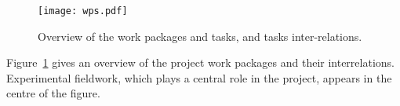 \begin{figure}[h!]
\centering
\texttt{[image: wps.pdf]}
\caption{Overview of the work packages and tasks, and tasks inter-relations.}
\label{fig:wps}
\end{figure}





Figure~\ref{fig:wps} gives an overview of the project
work packages and their interrelations. Experimental fieldwork, which plays a central role in the
project, appears in the centre of the figure.

